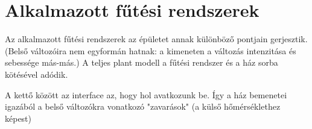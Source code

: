 %
%
%



\section{Alkalmazott fűtési rendszerek}

Az alkalmazott fűtési rendszerek az épületet annak különböző pontjain gerjesztik. (Belső változóira nem egyformán hatnak: a kimeneten a változás intenzitása és sebessége más-más.) A teljes plant modell a fűtési rendszer és a ház sorba kötésével adódik.

A kettő között az interface az, hogy hol avatkozunk be. Így a ház bemenetei igazából a belső változókra vonatkozó "zavarások" (a külső hőmérséklethez képest)




\pagebreak

